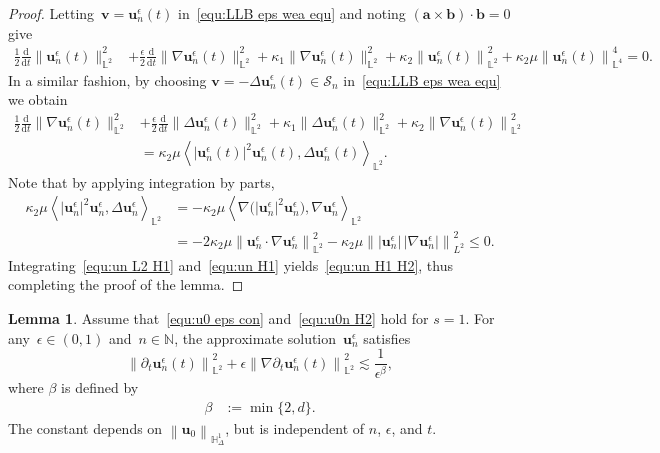 \documentclass[11pt,reqno]{amsart}
\theoremstyle{definition}
\newtheorem{lemma}[theorem]{Lemma}
\numberwithin{equation}{section}
\newcommand{\bff}{\boldsymbol}
\newcommand{\bb}{\mathbb}
\newcommand{\ddt}{\frac{\mathrm{d}}{\mathrm{d}t}}
\newcommand{\pa}{\partial}
\newcommand{\nn}{\nonumber}
\newcommand{\norm}[2]{\left\|{#1}\right\|_{#2}}
\newcommand{\inpro}[2]{\left\langle#1,#2\right\rangle}
\begin{document}
\begin{proof}
Letting~$\bff{v}=\bff{u}_n^\epsilon(t)$ in~\eqref{equ:LLB eps wea equ} and
noting $(\bff{a}\times\bff{b})\cdot\bff{b}=0$ give
\begin{align}\label{equ:un L2 H1}
\frac{1}{2}\ddt{ }\|\bff{u}^\epsilon_n(t)\|_{\bb{L}^2}^2 
&+
\frac{\epsilon}{2}\ddt{ }\|\nabla\bff{u}^\epsilon_n(t)\|_{\bb{L}^2}^2
+
\kappa_1\|\nabla\bff{u}^\epsilon_n(t)\|_{\bb{L}^2}^2
+
\kappa_2 \norm{\bff{u}_n^\epsilon(t)}{\bb{L}^2}^2
+
\kappa_2\mu \norm{\bff{u}_n^\epsilon(t)}{\bb{L}^4}^4
= 0.
\end{align}
In a similar fashion, by choosing $\bff{v}=-\Delta\bff{u}^\epsilon_n(t)\in \mathcal{S}_n$
in~\eqref{equ:LLB eps wea equ} we obtain
\begin{align}\label{equ:un H1}
\frac{1}{2}\ddt{}\|\nabla\bff{u}^\epsilon_n(t)\|_{\bb{L}^2}^2 
&+
\frac{\epsilon}{2}\ddt{ }\|\Delta\bff{u}^\epsilon_n(t)\|_{\bb{L}^2}^2
+
\kappa_1\|\Delta\bff{u}^\epsilon_n(t)\|_{\bb{L}^2}^2
+
\kappa_2 \norm{\nabla \bff{u}_n^\epsilon(t)}{\bb{L}^2}^2
\nn\\
&=
\kappa_2\mu
\inpro{|\bff{u}^\epsilon_n(t)|^2 \bff{u}^\epsilon_n(t)}{\Delta\bff{u}^\epsilon_n(t)}_{\bb{L}^2}.
\end{align}
Note that by applying integration by parts,
\begin{align*}
	\kappa_2 \mu 
	\inpro{|\bff{u}^\epsilon_n|^2 \bff{u}^\epsilon_n}{\Delta\bff{u}^\epsilon_n}_{\bb{L}^2}
	&=
	- \kappa_2 \mu 
	\inpro{\nabla\big(|\bff{u}^\epsilon_n|^2 \bff{u}_n^\epsilon\big)}
	{\nabla\bff{u}_n^\epsilon}_{\bb{L}^2}
	\\
	&=
	-2 \kappa_2 \mu 
	\norm{\bff{u}_n^\epsilon \cdot \nabla \bff{u}_n^\epsilon}{\bb{L}^2}^2
	-
	\kappa_2 \mu \norm{|\bff{u}_n^\epsilon|\, |\nabla \bff{u}_n^\epsilon|}{L^2}^2 
	\leq 0.
\end{align*}
Integrating~\eqref{equ:un L2 H1} and~\eqref{equ:un H1} yields~\eqref{equ:un H1 H2}, thus completing the proof of the lemma.
\end{proof}


\begin{lemma}\label{lem:ene est dtu}
Assume that~\eqref{equ:u0 eps con} and~\eqref{equ:u0n H2} hold for $s=1$. 
For any~$\epsilon\in(0,1)$ and~$n\in\bb{N}$, the approximate
solution~$\bff{u}_n^\epsilon$ satisfies
\begin{equation}\label{equ:est dt u L2}
	\norm{\pa_t\bff{u}_n^\epsilon(t)}{\bb{L}^2}^2
	+
	\epsilon \norm{\nabla\pa_t\bff{u}_n^\epsilon(t)}{\bb{L}^2}^2
	\lesssim
	\frac{1}{\epsilon^\beta},
\end{equation}
where $\beta$ is defined by
	\begin{align}
		\label{equ:d ast}
		\beta &:= \min\{2,d\}.
	\end{align}
The constant depends on $\norm{\bff{u}_0}{\bb{H}^1_\Delta}$, but is independent of $n$, $\epsilon$, and $t$.
\end{lemma}
\end{document}
